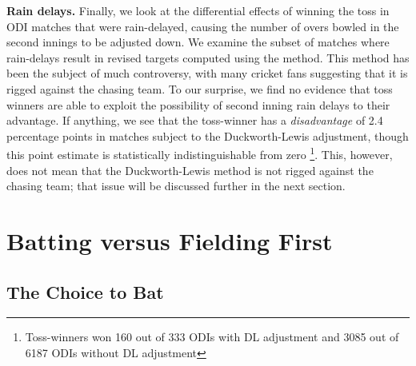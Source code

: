 \documentclass[11pt,  letterpaper]{article}
\begin{document}
\textbf{Rain delays.} Finally, we look at the differential effects of winning the toss in ODI matches that were rain-delayed, causing the number of overs bowled in the second innings to be adjusted down. We examine the subset of matches where rain-delays result in revised targets computed using the \citet{duckworth1998} method. This method has been the subject of much controversy, with many cricket fans suggesting that it is rigged against the chasing team. To our surprise, we find no evidence that toss winners are able to exploit the possibility of second inning rain delays to their advantage. If anything, we see that the toss-winner has a \emph{disadvantage} of 2.4 percentage points in matches subject to the Duckworth-Lewis adjustment, though this point estimate is statistically indistinguishable from zero \footnote{Toss-winners won 160 out of 333 ODIs with DL adjustment and 3085 out of 6187 ODIs without DL adjustment}. This, however, does not mean that the Duckworth-Lewis method is not rigged against the chasing team; that issue will be discussed further in the next section.



% 








\section{Batting versus Fielding First}

\subsection{The Choice to Bat}
\end{document}
